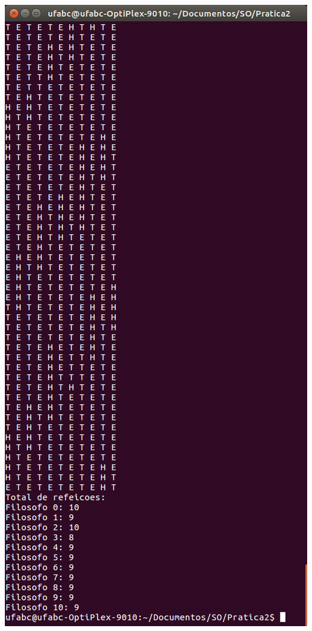 \begin{minipage}{\textwidth}
\begin{minipage}[b]{0.49\textwidth}
        \includegraphics[scale=.3]{pratica2/prog4cont.png}
        \label{prog5kill2png}
    \end{minipage}
    \hspace{1em}
\end{minipage}

